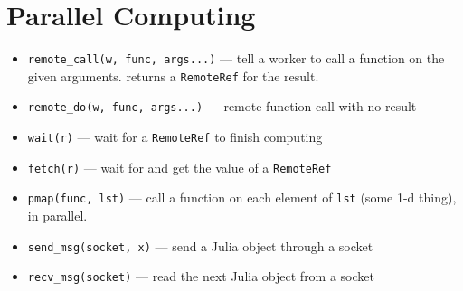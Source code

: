 \documentclass{article}
\begin{document}
\section{Parallel Computing}
\begin{itemize}
   \item \verb|remote_call(w, func, args...)| ---
     tell a worker to call a function on the given arguments.
     returns a \verb|RemoteRef| for the result.

   \item \verb|remote_do(w, func, args...)| ---
     remote function call with no result

   \item \verb|wait(r)| ---
     wait for a \verb|RemoteRef| to finish computing

   \item \verb|fetch(r)| ---
     wait for and get the value of a \verb|RemoteRef|

   \item \verb|pmap(func, lst)| ---
     call a function on each element of \verb|lst| (some 1-d thing), in
     parallel.

   \item \verb|send_msg(socket, x)| ---
     send a Julia object through a socket

   \item \verb|recv_msg(socket)| ---
     read the next Julia object from a socket
\end{itemize}
\end{document}
